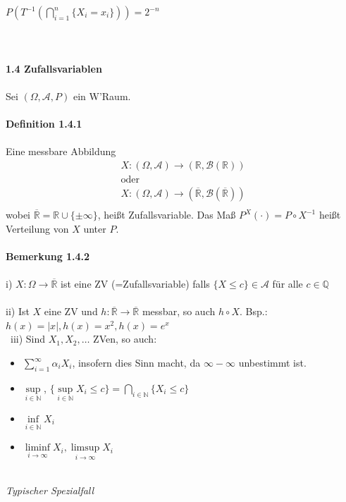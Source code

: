 \documentclass[10pt,a4paper]{report}
\numberwithin{equation}{section}
\numberwithin{figure}{section}
\theoremstyle{plain}
\theoremstyle{definition}
\theoremstyle{plain}
\theoremstyle{definition}
\theoremstyle{remark}
\theoremstyle{plain}
\theoremstyle{plain}
\theoremstyle{plain}
\newcommand{\1}{ \mathbb{1} } %
\begin{document}
$P\left(T^{-1}\left(\bigcap\limits_{i=1}^n\{X_i=x_i\}\right)\right)=2^{-n}$\\\\\\\\
\Large{\textbf{1.4 Zufallsvariablen}}\normalsize\\\\
Sei $(\Omega,\mathcal{A},P)$ ein W'Raum.\\\\
\textbf{Definition 1.4.1}\\\\
Eine messbare Abbildung 
\begin{eqnarray*}
X:(\Omega,\mathcal{A}) \to (\mathbb{R},\mathcal{B}(\mathbb{R}))\\
\text{oder}\\
X:(\Omega,\mathcal{A}) \to (\overline{\mathbb{R}},\mathcal{B}(\overline{\mathbb{R}}))\\
\end{eqnarray*}
wobei $\overline{\mathbb{R}}=\mathbb{R}\cup\{\pm \infty \}$, heißt Zufallsvariable. Das Maß $P^X(\cdot)=P\circ X^{-1}$ heißt Verteilung von $X$ unter $P$.\\\\
\textbf{Bemerkung 1.4.2}\\\\
i) $X: \Omega \to \overline{\mathbb{R}}$ ist eine ZV (=Zufallsvariable) falls $\{X\leq c\} \in \mathcal{A}$ für alle $c \in \mathbb{Q}$\\\\
ii) Ist $X$ eine ZV und $h:\overline{\mathbb{R}} \to \overline{\mathbb{R}}$ messbar, so auch $h\circ X$. Bsp.:$h(x)=|x|, h(x)=x^2, h(x)=e^x$\\\
iii) Sind $X_1,X_2,\dots$ ZVen, so auch:
\begin{itemize}
\item $\sum\limits_{i=1}^\infty \alpha_i X_i$, insofern dies Sinn macht, da $\infty-\infty$ unbestimmt ist.
\item $\sup\limits_{i\in \mathbb{N}}$, $\{\sup\limits_{i \in \mathbb{N}} X_i \leq c\}=\bigcap\limits_{i \in \mathbb{N}}\{X_i \leq c\}$
\item $\inf\limits_{i \in \mathbb{N}} X_i$
\item $\liminf\limits_{i \to \infty} X_i, \limsup\limits_{i \to \infty} X_i$
\end{itemize}
$ $\\
\textit{Typischer Spezialfall}\\\\
\end{document}
